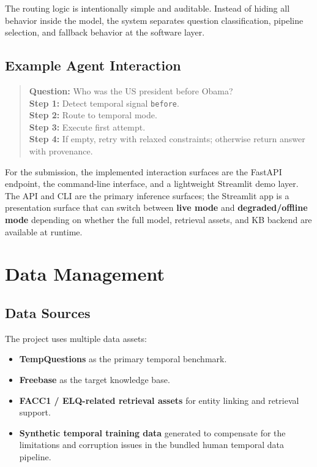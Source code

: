\documentclass[a4paper,11pt]{article}
\begin{document}
The routing logic is intentionally simple and auditable. Instead of hiding all behavior inside the model, the system separates question classification, pipeline selection, and fallback behavior at the software layer.

\subsection{Example Agent Interaction}

\begin{quote}
\textbf{Question:} Who was the US president before Obama? \\
\textbf{Step 1:} Detect temporal signal \texttt{before}. \\
\textbf{Step 2:} Route to temporal mode. \\
\textbf{Step 3:} Execute first attempt. \\
\textbf{Step 4:} If empty, retry with relaxed constraints; otherwise return answer with provenance.
\end{quote}

\noindent For the submission, the implemented interaction surfaces are the FastAPI endpoint, the command-line interface, and a lightweight Streamlit demo layer. The API and CLI are the primary inference surfaces; the Streamlit app is a presentation surface that can switch between \textbf{live mode} and \textbf{degraded/offline mode} depending on whether the full model, retrieval assets, and KB backend are available at runtime.

\section{Data Management}

\subsection{Data Sources}

The project uses multiple data assets:

\begin{itemize}[leftmargin=1.2cm]
  \item \textbf{TempQuestions} as the primary temporal benchmark.
  \item \textbf{Freebase} as the target knowledge base.
  \item \textbf{FACC1 / ELQ-related retrieval assets} for entity linking and retrieval support.
  \item \textbf{Synthetic temporal training data} generated to compensate for the limitations and corruption issues in the bundled human temporal data pipeline.
\end{itemize}
\end{document}
